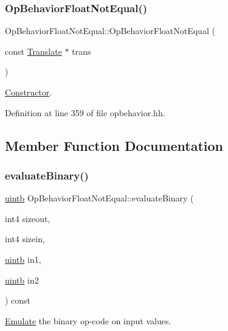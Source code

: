 \subsubsection{\texorpdfstring{OpBehaviorFloatNotEqual()}{OpBehaviorFloatNotEqual()}}
{\footnotesize\ttfamily Op\+Behavior\+Float\+Not\+Equal\+::\+Op\+Behavior\+Float\+Not\+Equal (\begin{DoxyParamCaption}\item[{const \mbox{\hyperlink{class_translate}{Translate}} $\ast$}]{trans }\end{DoxyParamCaption})\hspace{0.3cm}{\ttfamily [inline]}}



\mbox{\hyperlink{class_constructor}{Constructor}}. 



Definition at line 359 of file opbehavior.\+hh.



\subsection{Member Function Documentation}
\mbox{\label{class_op_behavior_float_not_equal_a4e0acf16f0848572ebf965f489f2db9f}} 
\subsubsection{\texorpdfstring{evaluateBinary()}{evaluateBinary()}}
{\footnotesize\ttfamily \mbox{\hyperlink{types_8h_a2db313c5d32a12b01d26ac9b3bca178f}{uintb}} Op\+Behavior\+Float\+Not\+Equal\+::evaluate\+Binary (\begin{DoxyParamCaption}\item[{int4}]{sizeout,  }\item[{int4}]{sizein,  }\item[{\mbox{\hyperlink{types_8h_a2db313c5d32a12b01d26ac9b3bca178f}{uintb}}}]{in1,  }\item[{\mbox{\hyperlink{types_8h_a2db313c5d32a12b01d26ac9b3bca178f}{uintb}}}]{in2 }\end{DoxyParamCaption}) const\hspace{0.3cm}{\ttfamily [virtual]}}



\mbox{\hyperlink{class_emulate}{Emulate}} the binary op-\/code on input values. 


